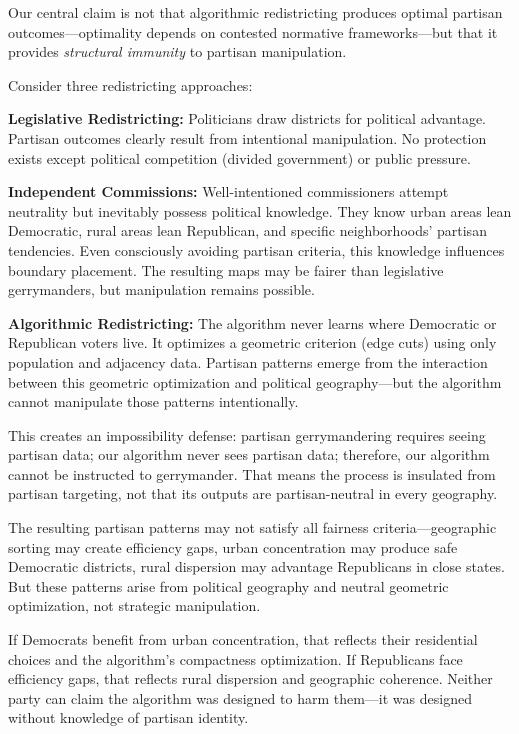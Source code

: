 Our central claim is not that algorithmic redistricting produces optimal partisan outcomes—optimality depends on contested normative frameworks—but that it provides \textit{structural immunity} to partisan manipulation.

Consider three redistricting approaches:

\textbf{Legislative Redistricting:} Politicians draw districts for political advantage. Partisan outcomes clearly result from intentional manipulation. No protection exists except political competition (divided government) or public pressure.

\textbf{Independent Commissions:} Well-intentioned commissioners attempt neutrality but inevitably possess political knowledge. They know urban areas lean Democratic, rural areas lean Republican, and specific neighborhoods' partisan tendencies. Even consciously avoiding partisan criteria, this knowledge influences boundary placement. The resulting maps may be fairer than legislative gerrymanders, but manipulation remains possible.

\textbf{Algorithmic Redistricting:} The algorithm never learns where Democratic or Republican voters live. It optimizes a geometric criterion (edge cuts) using only population and adjacency data. Partisan patterns emerge from the interaction between this geometric optimization and political geography—but the algorithm cannot manipulate those patterns intentionally.

This creates an impossibility defense: partisan gerrymandering requires seeing partisan data; our algorithm never sees partisan data; therefore, our algorithm cannot be instructed to gerrymander. That means the process is insulated from partisan targeting, not that its outputs are partisan-neutral in every geography.

The resulting partisan patterns may not satisfy all fairness criteria—geographic sorting may create efficiency gaps, urban concentration may produce safe Democratic districts, rural dispersion may advantage Republicans in close states. But these patterns arise from political geography and neutral geometric optimization, not strategic manipulation.

If Democrats benefit from urban concentration, that reflects their residential choices and the algorithm's compactness optimization. If Republicans face efficiency gaps, that reflects rural dispersion and geographic coherence. Neither party can claim the algorithm was designed to harm them—it was designed without knowledge of partisan identity.

